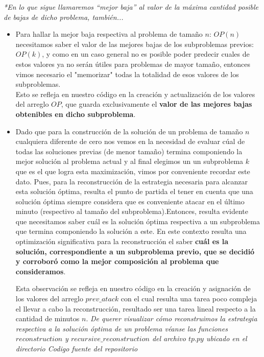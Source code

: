 \textit{*En lo que sigue llamaremos ``mejor baja''  al valor de la máxima cantidad posible de bajas de dicho problema, también...}
\begin{itemize}
    \item Para hallar la mejor baja respectiva al problema de tamaño $n$: $OP(n)$ necesitamos saber el valor de las mejores bajas de los subproblemas previos: $OP(k)$, y como en un caso general no es posible poder predecir cuales de estos valores ya no serán útiles para problemas de mayor tamaño, entonces vimos necesario el "memorizar" todas la totalidad de esos valores de los subproblemas. \\
    Esto se refleja en nuestro código en la creación y actualización de los valores del arreglo $OP$, que guarda exclusivamente el \textbf{valor de las mejores bajas obtenibles en dicho subproblema}.  
    
    \item Dado que para la construcción de la solución de un problema de tamaño $n$ cualquiera diferente de cero nos vemos en la necesidad de evaluar cúal de todas las soluciones previas (de menor tamaño) termina componiendo la mejor solución al problema actual y al final elegimos un un subproblema $k$ que es el que logra esta maximización, vimos por conveniente recordar este dato.
    Pues, para la reconstrucción de la estrategia necesaria para alcanzar esta solución óptima, resulta el punto de partida el tener en cuenta que una solución óptima siempre considera que es conveniente atacar en el último minuto (respectivo al tamaño del subproblema).Entonces, resulta evidente que necesitamos saber cuál es la solución óptima respectiva a un subproblema que termina componiendo la solución a este. 
    En este contexto resulta una optimización significativa para la reconstrucción el saber \textbf{cuál es la solución, correspondiente a un subproblema previo, que se decidió y corroboró como la mejor composición al problema que consideramos}.
    
    Esta observación se refleja en nuestro código en la creación y asignación de los valores del arreglo $prev\_atack$ con el cual resulta una tarea poco compleja el llevar a cabo la reconstrucción, resultado ser una tarea lineal respecto a la cantidad de minutos $n$. 
    \textit{De querer visualizar cómo reconstruimos la estrategia respectiva a la solución óptima de un problema véanse las funciones $reconstruction$ y $recursive\_reconstruction$ del archivo $tp.py$ ubicado en el directorio Codigo fuente del repositorio} 
\end{itemize}


